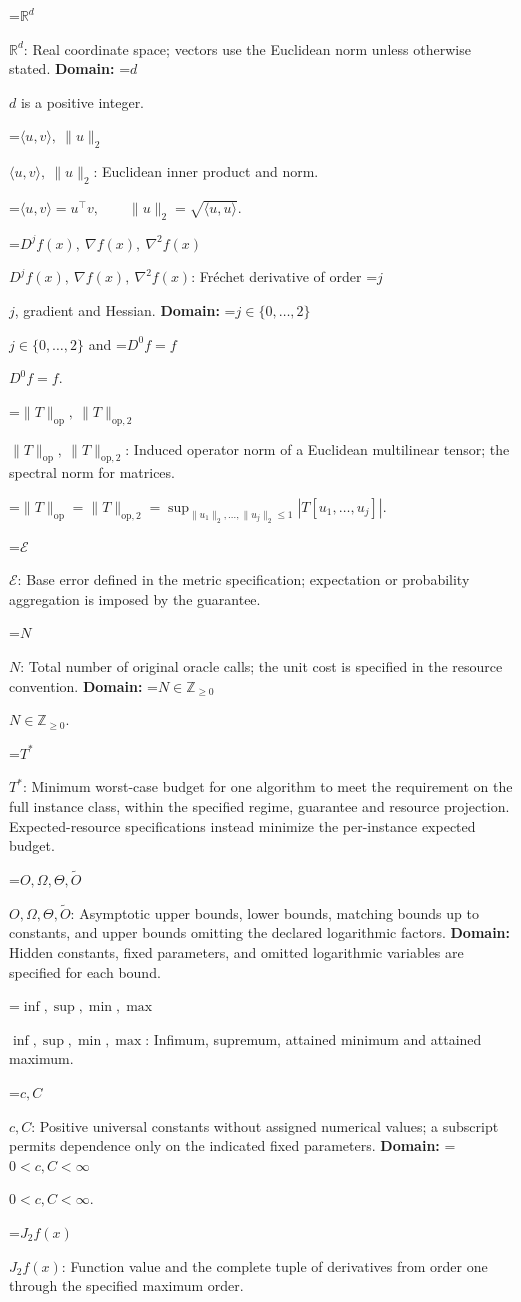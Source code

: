 \documentclass[10pt,a4paper]{article}
\newcommand{\AtlasMath}[1]{\par\begingroup\centering\setbox0=\hbox{$\displaystyle #1$}\ifdim\wd0>1.4\linewidth\typeout{ATLAS WIDE FORMULA: \the\wd0}\fi\ifdim\wd0>\linewidth\resizebox{\linewidth}{!}{\box0}\else\box0\fi\par\endgroup}
\newcommand{\AtlasInlineMath}[1]{\begingroup\setbox0=\hbox{$#1$}\ifdim\wd0>.4\linewidth\endgroup\AtlasMath{#1}\else\endgroup$#1$\fi}
\begin{document}
\AtlasInlineMath{\mathbb{R}^d}: Real coordinate space; vectors use the Euclidean norm unless otherwise stated. \textbf{Domain:} \AtlasInlineMath{d} is a positive integer.

\AtlasInlineMath{\langle u,v\rangle,\ \|u\|_2}: Euclidean inner product and norm.


\AtlasMath{\langle u,v\rangle=u^\top v,\qquad\|u\|_2=\sqrt{\langle u,u\rangle}.}


\AtlasInlineMath{D^jf(x),\ \nabla f(x),\ \nabla^2f(x)}: Fréchet derivative of order \AtlasInlineMath{j}, gradient and Hessian. \textbf{Domain:} \AtlasInlineMath{j\in\{0,\ldots,2\}} and \AtlasInlineMath{D^0f=f}.

\AtlasInlineMath{\|T\|_{\mathrm{op}},\ \|T\|_{\mathrm{op},2}}: Induced operator norm of a Euclidean multilinear tensor; the spectral norm for matrices.


\AtlasMath{\|T\|_{\mathrm{op}}=\|T\|_{\mathrm{op},2}=\sup_{\|u_1\|_2,\ldots,\|u_j\|_2\le1}|T[u_1,\ldots,u_j]|.}


\AtlasInlineMath{\mathcal{E}}: Base error defined in the metric specification; expectation or probability aggregation is imposed by the guarantee.

\AtlasInlineMath{N}: Total number of original oracle calls; the unit cost is specified in the resource convention. \textbf{Domain:} \AtlasInlineMath{N\in\mathbb{Z}_{\ge0}}.

\AtlasInlineMath{T^*}: Minimum worst-case budget for one algorithm to meet the requirement on the full instance class, within the specified regime, guarantee and resource projection. Expected-resource specifications instead minimize the per-instance expected budget.

\AtlasInlineMath{O,\Omega,\Theta,\widetilde{O}}: Asymptotic upper bounds, lower bounds, matching bounds up to constants, and upper bounds omitting the declared logarithmic factors. \textbf{Domain:} Hidden constants, fixed parameters, and omitted logarithmic variables are specified for each bound.

\AtlasInlineMath{\inf,\sup,\min,\max}: Infimum, supremum, attained minimum and attained maximum.

\AtlasInlineMath{c,C}: Positive universal constants without assigned numerical values; a subscript permits dependence only on the indicated fixed parameters. \textbf{Domain:} \AtlasInlineMath{0<c,C<\infty}.

\AtlasInlineMath{J_{2}f(x)}: Function value and the complete tuple of derivatives from order one through the specified maximum order.
\end{document}
